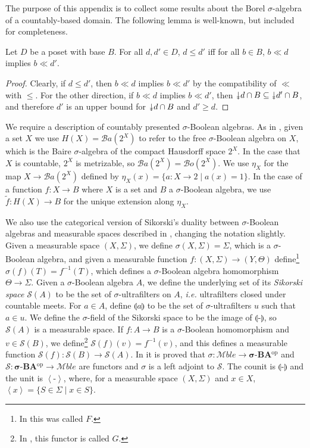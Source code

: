 \documentclass{lmcs}
\newcommand{\blank}{\ensuremath{{\mbox{-}}}}
\newcommand{\doubledownarrow}{\rotatebox[origin=c]{-90}{$\twoheadrightarrow$}}
\newcommand{\Mble}{\ensuremath{\mathcal{M}ble}}
\newcommand{\cat}[1]{\ensuremath{\mathbf{#1}}}
\newcommand{\Ba}{\mathcal{B}a} %
\newcommand{\op}{\ensuremath{^{\mathrm{op}}}}
\newcommand{\dd}{\doubledownarrow}
\newcommand{\sigmaBA}{\cat{\sigma\text{-}BA}}
\newcommand{\Bo}{\ensuremath{\mathcal{B}o}} %
\newcommand{\princip}[1]{\left\langle #1 \right\rangle}
\newcommand{\ban}[1]{\llparenthesis #1 \rrparenthesis}
\newcommand{\Sik}{\mathcal{S}}
\begin{document}
The purpose of this appendix is to collect some results about the Borel $\sigma$-algebra of a countably-based domain. The following lemma is well-known, but included for completeness. 
\begin{lem}
\label{BaseIneqLemma}
Let $D$ be a poset with base $B$. For all $d, d' \in D$, $d \leq d'$ iff for all $b \in B$, $b \ll d$ implies $b \ll d'$. 
\end{lem}
\begin{proof}
Clearly, if $d \leq d'$, then $b \ll d$ implies $b \ll d'$ by the compatibility of $\ll$ with $\leq$. For the other direction, if $b \ll d$ implies $b \ll d'$, then $\dd d \cap B \subseteq \dd d' \cap B$, and therefore $d'$ is an upper bound for $\dd d \cap B$ and $d' \geq d$. 
\end{proof}

We require a description of countably presented $\sigma$-Boolean algebras. As in \cite[\S IV]{unresStoneProc}, given a set $X$ we use $H(X) = \Ba(2^X)$ to refer to the free $\sigma$-Boolean algebra on $X$, which is the Baire $\sigma$-algebra of the compact Hausdorff space $2^X$. In the case that $X$ is countable, $2^X$ is metrizable, so $\Ba(2^X) = \Bo(2^X)$. We use $\eta_X$ for the map $X \rightarrow \Ba(2^X)$ defined by $\eta_X(x) = \{ a : X \rightarrow 2 \mid a(x) = 1 \}$. In the case of a function $f : X \rightarrow B$ where $X$ is a set and $B$ a $\sigma$-Boolean algebra, we use $\tilde{f} : H(X) \rightarrow B$ for the unique extension along $\eta_X$. 

We also use the categorical version of Sikorski's duality between $\sigma$-Boolean algebras and measurable spaces described in \cite[\S III]{unresStoneProc}, changing the notation slightly. Given a measurable space $(X,\Sigma)$, we define $\sigma(X,\Sigma) = \Sigma$, which is a $\sigma$-Boolean algebra, and given a measurable function $f : (X,\Sigma) \rightarrow (Y,\Theta)$ define\footnote{In \cite[\S III]{unresStoneProc} this was called $F$.} $\sigma(f)(T) = f^{-1}(T)$, which defines a $\sigma$-Boolean algebra homomorphism $\Theta \rightarrow \Sigma$. Given a $\sigma$-Boolean algebra $A$, we define the underlying set of its \emph{Sikorski space} $\Sik(A)$ to be the set of $\sigma$-ultrafilters on $A$, \emph{i.e.} ultrafilters closed under countable meets. For $a \in A$, define $\ban{a}$ to be the set of $\sigma$-ultrafilters $u$ such that $a \in u$. We define the $\sigma$-field of the Sikorski space to be the image of $\ban{\blank}$, so $\Sik(A)$ is a measurable space. If $f : A \rightarrow B$ is a $\sigma$-Boolean homomorphism and $v \in \Sik(B)$, we define\footnote{In \cite[\S III]{unresStoneProc}, this functor is called $G$.} $\Sik(f)(v) = f^{-1}(v)$, and this defines a measurable function $\Sik(f) : \Sik(B) \rightarrow \Sik(A)$. In \cite[\S III, Theorem 5]{unresStoneProc} it is proved that $\sigma : \Mble \rightarrow \sigmaBA\op$ and $\Sik : \sigmaBA\op \rightarrow \Mble$ are functors and $\sigma$ is a left adjoint to $\Sik$. The counit is $\ban{\blank}$ and the unit is $\princip{\blank}$, where, for a measurable space $(X,\Sigma)$ and $x \in X$, $\princip{x} = \{S \in \Sigma \mid x \in S\}$. 
\end{document}
